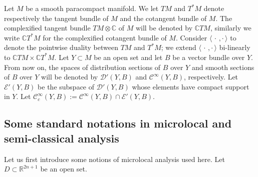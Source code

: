 \documentclass[12pt]{amsart}
\theoremstyle{definition}
\theoremstyle{named}
\numberwithin{equation}{subsection}
\newcommand{\R}{\mathbb{R}}
\def\cC{\mathscr{C}}
\begin{document}
Let $M$ be a smooth paracompact manifold. We let $TM$ and $T^*M$ denote respectively the tangent bundle of $M$ and the cotangent bundle of $M$. The complexified tangent bundle $TM \otimes \mathbb{C}$ of $M$ will be denoted by $\mathbb C TM$, similarly we write $\mathbb C T^*M$ for the complexified cotangent bundle of $M$. Consider $\langle\,\cdot\,,\cdot\,\rangle$ to denote the pointwise
duality between $TM$ and $T^*M$; we extend $\langle\,\cdot\,,\cdot\,\rangle$ bi-linearly to $\mathbb CTM\times\mathbb C T^*M$. 
Let $Y\subset M$ be an open set and let $B$ be a vector bundle over $Y$. From now on, the spaces of distribution sections of $B$ over $Y$ and smooth sections of $B$ over $Y$ will be denoted by $\mathcal D'(Y, B)$ and $\cC^\infty(Y, B)$, respectively.
Let $\mathcal E'(Y, B)$ be the subspace of $\mathcal D'(Y, B)$ whose elements have compact support in $Y$. Let $\cC^\infty_c(Y,B):=\cC^\infty(Y,B)\cap\mathcal{E}'(Y,B)$. 


\subsection{Some standard notations in microlocal and semi-classical analysis}\label{s-gue170111w} 

Let us first introduce some notions of microlocal analysis used here. Let $D\subset\R^{2n+1}$ be an open set. 
	
\end{document}
